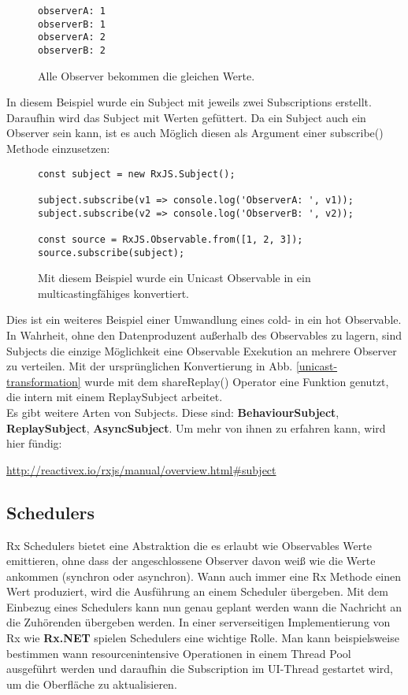 \begin{figure}[H]
\begin{lstlisting}
observerA: 1
observerB: 1
observerA: 2
observerB: 2
\end{lstlisting}
\caption{Alle Observer bekommen die gleichen Werte.}
\end{figure}

\noindent
In diesem Beispiel wurde ein Subject mit jeweils zwei Subscriptions erstellt. Daraufhin wird das Subject mit Werten \glqq gefüttert\grqq. Da ein Subject auch ein Observer sein kann, ist es auch Möglich diesen als Argument einer subscribe() Methode einzusetzen:

\begin{figure}[H]
\begin{lstlisting}[basicstyle=\small]
const subject = new RxJS.Subject();

subject.subscribe(v1 => console.log('ObserverA: ', v1));
subject.subscribe(v2 => console.log('ObserverB: ', v2));

const source = RxJS.Observable.from([1, 2, 3]);
source.subscribe(subject);
\end{lstlisting}
\caption{Mit diesem Beispiel wurde ein Unicast Observable in ein multicastingfähiges konvertiert.}
\end{figure}


\noindent
Dies ist ein weiteres Beispiel einer Umwandlung eines cold- in ein hot Observable. In Wahrheit, ohne den Datenproduzent außerhalb des Observables zu lagern, sind Subjects die einzige Möglichkeit eine Observable Exekution an mehrere Observer zu verteilen. Mit der ursprünglichen Konvertierung in Abb. \ref{unicast-transformation} wurde mit dem shareReplay() Operator eine Funktion genutzt, die intern mit einem ReplaySubject arbeitet.\\

\noindent
Es gibt weitere Arten von Subjects. Diese sind: \textbf{BehaviourSubject}, \textbf{ReplaySubject}, \textbf{AsyncSubject}. Um mehr von ihnen zu erfahren kann, wird hier fündig:

\begin{center}
    \url{http://reactivex.io/rxjs/manual/overview.html#subject}
\end{center}

\subsection{Schedulers}

Rx Schedulers bietet eine Abstraktion die es erlaubt wie Observables Werte emittieren, ohne dass der angeschlossene Observer davon weiß wie die Werte ankommen (synchron oder asynchron). Wann auch immer eine Rx Methode einen Wert produziert, wird die Ausführung an einem Scheduler übergeben. Mit dem Einbezug eines Schedulers kann nun genau geplant werden wann die Nachricht an die Zuhörenden übergeben werden. In einer serverseitigen Implementierung von Rx wie \textbf{Rx.NET} spielen Schedulers eine wichtige Rolle. Man kann beispielsweise bestimmen wann resourcenintensive Operationen in einem Thread Pool ausgeführt werden und daraufhin die Subscription im UI-Thread gestartet wird, um die Oberfläche zu aktualisieren\cite{rx-schedulers}.\\

